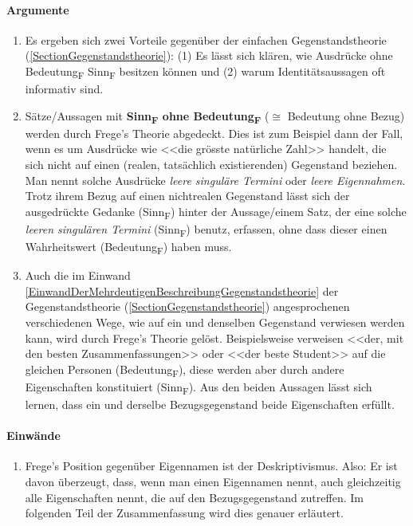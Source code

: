 \documentclass[../main.tex]{subfiles}
\begin{document}
\paragraph{Argumente}
\begin{enumerate}
	\item Es ergeben sich zwei Vorteile gegenüber der einfachen Gegenstandstheorie (\ref{SectionGegenstandstheorie}): (1) Es lässt sich klären, wie Ausdrücke ohne Bedeutung\textsubscript{F} Sinn\textsubscript{F} besitzen können und (2) warum Identitätsaussagen oft informativ sind.
	\item Sätze/Aussagen mit \textbf{Sinn\textsubscript{F} ohne Bedeutung\textsubscript{F}} ($\cong$ Bedeutung ohne Bezug) werden durch Frege's Theorie abgedeckt. Dies ist zum Beispiel dann der Fall, wenn es um Ausdrücke wie <<die grösste natürliche Zahl>> handelt, die sich nicht auf einen (realen, tatsächlich existierenden) Gegenstand beziehen. Man nennt solche Ausdrücke \textit{leere singuläre Termini} oder \textit{leere Eigennahmen}. Trotz ihrem Bezug auf einen nichtrealen Gegenstand lässt sich der ausgedrückte Gedanke (Sinn\textsubscript{F}) hinter der Aussage/einem Satz, der eine solche \textit{leeren singulären Termini} (Sinn\textsubscript{F}) benutz, erfassen, ohne dass dieser einen Wahrheitswert (Bedeutung\textsubscript{F}) haben muss. 
	\item Auch die im Einwand \ref{EinwandDerMehrdeutigenBeschreibungGegenstandstheorie} der Gegenstandstheorie (\ref{SectionGegenstandstheorie}) angesprochenen verschiedenen Wege, wie auf ein und denselben Gegenstand verwiesen werden kann, wird durch Frege's Theorie gelöst. Beispielsweise verweisen <<der, mit den besten Zusammenfassungen>> oder <<der beste Student>> auf die gleichen Personen (Bedeutung\textsubscript{F}), diese werden aber durch andere Eigenschaften konstituiert (Sinn\textsubscript{F}). Aus den beiden Aussagen lässt sich lernen, dass ein und derselbe Bezugsgegenstand beide Eigenschaften erfüllt. 
\end{enumerate}

\paragraph{Einwände}
\begin{enumerate}
	\item Frege's Position gegenüber Eigennamen ist der Deskriptivismus. Also: Er ist davon überzeugt, dass, wenn man einen Eigennamen nennt, auch gleichzeitig alle Eigenschaften nennt, die auf den Bezugsgegenstand zutreffen. Im folgenden Teil der Zusammenfassung wird dies genauer erläutert. 
\end{enumerate}
\end{document}
